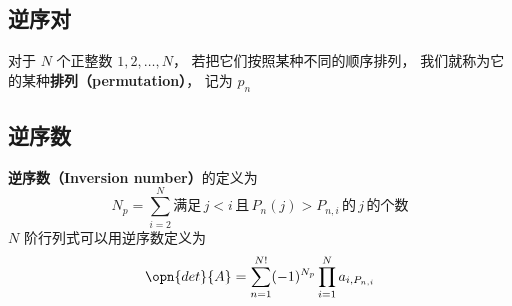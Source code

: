 
\subsection{逆序对}
对于 $N$ 个正整数 $1,2,\dots, N$， 若把它们按照某种不同的顺序排列， 我们就称为它的某种\textbf{排列（permutation）}， 记为 $p_n$

\subsection{逆序数}
\textbf{逆序数（Inversion number）}的定义为
\begin{equation}\label{InvNum_eq5}
N_p = \sum_{i=2}^N \text{满足}\, j<i \,\text{且}\, P_n(j) > P_{n,i} \, \text{的}\, j\, \text{的个数} 
\end{equation}
$N$ 阶行列式可以用逆序数定义为
\begin{equation}\label{InvNum_eq4}
\opn{det}{A} = \sum_{n=1}^{N!} (-1)^{N_p} \prod_{i=1}^N a_{i,P_{n,i}}
\end{equation}

